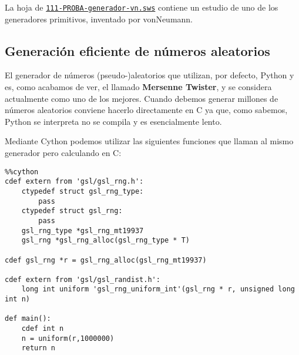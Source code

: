  La hoja de 
\href{http://sage.mat.uam.es:8888/home/pub/??/}{\tt 111-PROBA-generador-vn.sws}
contiene un estudio de uno de los generadores primitivos, inventado por
vonNeumann.

\subsection{Generaci\'on eficiente de n\'umeros aleatorios} 


El generador de n\'umeros (pseudo-)aleatorios que utilizan, por defecto, Python y {\sage} es, como acabamos de ver,  el llamado {\bf Mersenne Twister}, y se considera actualmente como uno de los mejores. Cuando debemos generar millones de n\'umeros  aleatorios conviene hacerlo directamente en C ya que, como sabemos, Python se interpreta no se compila y es esencialmente lento. 

Mediante Cython podemos utilizar las siguientes funciones que llaman al mismo generador pero calculando en C: 

\begin{lstlisting}
%%cython
cdef extern from 'gsl/gsl_rng.h':
	ctypedef struct gsl_rng_type:
		pass
	ctypedef struct gsl_rng:
		pass
	gsl_rng_type *gsl_rng_mt19937
	gsl_rng *gsl_rng_alloc(gsl_rng_type * T)

cdef gsl_rng *r = gsl_rng_alloc(gsl_rng_mt19937)

cdef extern from 'gsl/gsl_randist.h':
	long int uniform 'gsl_rng_uniform_int'(gsl_rng * r, unsigned long int n)

def main():
	cdef int n
	n = uniform(r,1000000)
	return n
\end{lstlisting}






